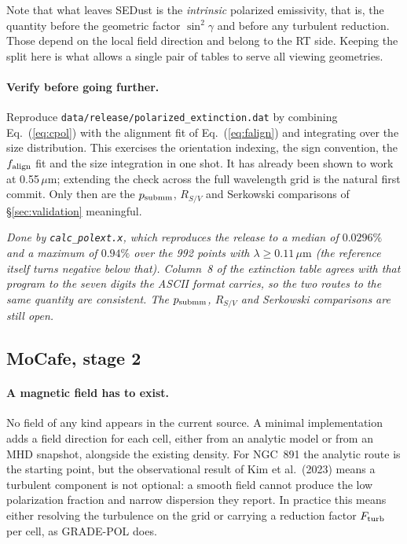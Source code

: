 \documentclass{my_memo}
\newcommand{\code}[1]{\texttt{#1}}
\newcommand{\um}{\ensuremath{\,\mu\mathrm{m}}}
\newcommand{\falign}{\ensuremath{f_{\rm align}}}
\begin{document}
Note that what leaves SEDust is the \emph{intrinsic} polarized
emissivity, that is, the quantity before the geometric factor
$\sin^2\gamma$ and before any turbulent reduction. Those depend on the
local field direction and belong to the RT side. Keeping the split here
is what allows a single pair of tables to serve all viewing geometries.

\paragraph{Verify before going further.} Reproduce
\code{data/release/polarized\_extinction.dat} by combining
Eq.~(\ref{eq:cpol}) with the alignment fit of Eq.~(\ref{eq:falign})
and integrating over the size distribution. This exercises the orientation indexing, the sign
convention, the $\falign$ fit and the size integration in one shot. It
has already been shown to work at 0.55\um; extending the check across
the full wavelength grid is the natural first commit. Only then are the
$p_{\rm submm}$, $R_{S/V}$ and Serkowski comparisons of
\S\ref{sec:validation} meaningful.

\emph{Done by \code{calc\_polext.x}, which reproduces the release to a
median of $0.0296\%$ and a maximum of $0.94\%$ over the 992 points with
$\lambda \ge 0.11\um$ (the reference itself turns negative below that).
Column~8 of the extinction table agrees with that program to the seven
digits the ASCII format carries, so the two routes to the same quantity
are consistent. The $p_{\rm submm}$, $R_{S/V}$ and Serkowski comparisons
are still open.}

\subsection{MoCafe, stage 2}

\paragraph{A magnetic field has to exist.} No field of any kind appears
in the current source. A minimal implementation adds a field direction
for each cell, either from an analytic model or from an MHD snapshot,
alongside the existing density. For NGC~891 the analytic route is the
starting point, but the observational result of Kim et al.\ (2023) means
a turbulent component is not optional: a smooth field cannot produce the
low polarization fraction and narrow dispersion they report. In practice
this means either resolving the turbulence on the grid or carrying a
reduction factor $F_{\rm turb}$ per cell, as GRADE-POL does.
\end{document}
